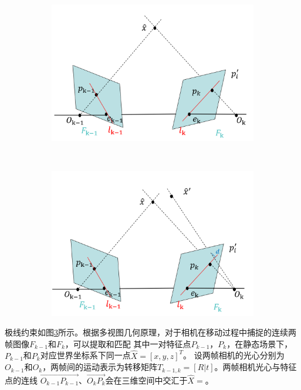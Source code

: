 \begin{figure}[!htbp]
    \centering
    \begin{subfigure}[b]{0.35\textwidth}
      \includegraphics[width=\textwidth]{Img/3-epiplorConstrain.png}
      \caption{}
      \label{fig:epiplorConstrain}
    \end{subfigure}%
    ~%
    \begin{subfigure}[b]{0.35\textwidth}
      \includegraphics[width=\textwidth]{Img/3-epiplorConstrain2.jpg}
      \caption{}
      \label{fig:epiplorConstrain2}
    \end{subfigure}
    \label{fig:epiplor}
\end{figure}
极线约束如图\ref{fig:epiplor}所示。根据多视图几何原理\citep{hartley2003multiple}，对于相机在移动过程中捕捉的连续两帧图像$F_{k-1}$和$F_{k}$，可以提取和匹配
其中一对特征点$P_{k-1}$，$P_{k}$，在静态场景下，$P_{k-1}$和$P_{k}$对应世界坐标系下同一点$\hat{X}=\left[x,y,z\right]^{T}$。
设两帧相机的光心分别为$O_{k-1}$和$O_{k}$，两帧间的运动表示为转移矩阵$T_{k-1,k}=\left[R|t\right]$。两帧相机光心与特征点的连线
$\vec{O_{k-1}P_{k-1}}$、$\vec{O_{k}P_{k}}$会在三维空间中交汇于$\hat{X}=$。

